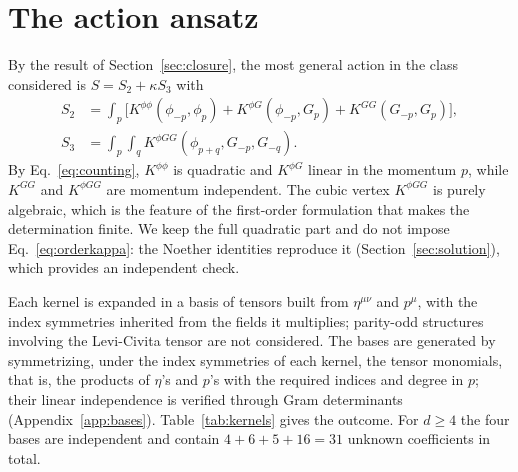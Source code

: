 \documentclass[prd,aps,preprint,nofootinbib,amsmath,amssymb,eqsecnum]{revtex4-2}
\newcommand{\ip}[1]{\int_{#1}}
\begin{document}
\section{The action ansatz}
\label{sec:ansatz}

By the result of Section~\ref{sec:closure}, the most general action in the class considered
is $S=S_2+\kappa S_3$ with
\begin{equation}
\begin{aligned}
S_2&=\ip{p}\Big[K^{\phi\phi}(\phi_{-p},\phi_p)+K^{\phi G}(\phi_{-p},G_p)+K^{GG}(G_{-p},G_p)\Big],\\
S_3&=\ip{p}\ip{q}K^{\phi GG}(\phi_{p+q},G_{-p},G_{-q}).
\end{aligned}
\label{eq:ansatz}
\end{equation}
By Eq.~\eqref{eq:counting}, $K^{\phi\phi}$ is quadratic and $K^{\phi G}$ linear in the
momentum $p$, while $K^{GG}$ and $K^{\phi GG}$ are momentum independent. The cubic vertex
$K^{\phi GG}$ is purely algebraic, which is the feature of the first-order formulation that
makes the determination finite. We keep the full quadratic part and do not impose
Eq.~\eqref{eq:orderkappa}: the Noether identities reproduce it
(Section~\ref{sec:solution}), which provides an independent check.

Each kernel is expanded in a basis of tensors built from
$\eta^{\mu\nu}$ and $p^\mu$, with the index symmetries inherited from the fields it
multiplies; parity-odd structures involving the Levi-Civita tensor are not considered. The
bases are generated by symmetrizing, under the index symmetries of each kernel, the tensor
monomials, that is, the products of $\eta$'s and $p$'s with the required indices and degree
in $p$; their linear independence is verified through Gram determinants
(Appendix~\ref{app:bases}). Table~\ref{tab:kernels} gives the outcome. For $d\geq4$ the
four bases are independent and contain $4+6+5+16=31$ unknown coefficients in total.
\end{document}
